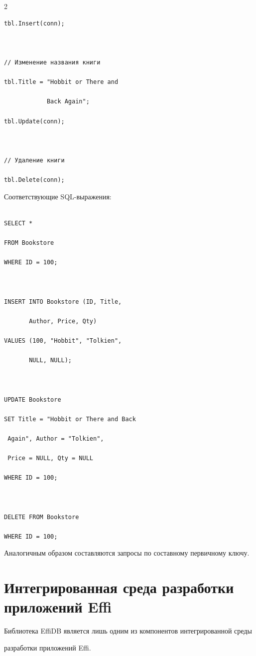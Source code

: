 \begin{multicols}{2}
\begin{verbatim}
tbl.Insert(conn);



// Изменение названия книги

tbl.Title = "Hobbit or There and

            Back Again";

tbl.Update(conn);



// Удаление книги

tbl.Delete(conn);

\end{verbatim}



Соответствующие SQL-выражения: 

\begin{verbatim}

SELECT *

FROM Bookstore

WHERE ID = 100;



INSERT INTO Bookstore (ID, Title, 

       Author, Price, Qty)

VALUES (100, "Hobbit", "Tolkien", 

       NULL, NULL);



UPDATE Bookstore

SET Title = "Hobbit or There and Back 

 Again", Author = "Tolkien", 

 Price = NULL, Qty = NULL

WHERE ID = 100;



DELETE FROM Bookstore

WHERE ID = 100;

\end{verbatim}



Аналогичным образом составляются запросы по составному первичному ключу.



\section{Интегрированная среда разработки приложений Effi}



Библиотека EffiDB является лишь одним из компонентов интегрированной среды 

разработки приложений Effi.




\end{multicols}
